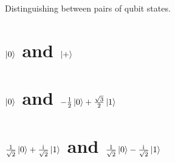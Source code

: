 \documentclass[boxes]{homework}
\newcommand{\iu}{\mathrm{i}\mkern1mu}
\begin{document}
\begin{problem}
Distinguishing between pairs of qubit states.
\begin{parts}
	\part{$\ket{0}$ and $\ket{+}$}\label{part:1a}
	\part{$\ket{0}$ and $-\frac{1}{2}\ket{0} + \frac{\sqrt{3}}{2}\ket{1}$}\label{part:1b}
	\part{$\frac{1}{\sqrt{2}}\ket{0} + \frac{\iu}{\sqrt{2}}\ket{1}$ and $\frac{1}{\sqrt{2}}\ket{0} - \frac{\iu}{\sqrt{2}}\ket{1}$}\label{part:1c}
\end{parts}
\end{problem}
\end{document}
